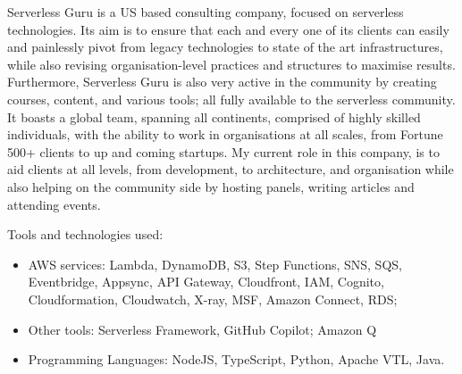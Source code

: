 \documentclass[a4paper,20pt]{article}
\begin{document}
Serverless Guru is a US based consulting company, focused on serverless 
technologies. Its aim is to ensure that each and every one of its clients 
can easily and painlessly pivot from legacy technologies to state of the art 
infrastructures, while also revising organisation-level practices and structures 
to maximise results. Furthermore, Serverless Guru is also very active in the 
community by creating courses, content, and various tools; all fully available 
to the serverless community. It boasts a global team, spanning all continents, 
comprised of highly skilled individuals, with the ability to work in 
organisations at all scales, from Fortune 500+ clients to up and coming 
startups. My current role in this company, is to aid clients at all levels, from 
development, to architecture, and organisation while also helping on the 
community side by hosting panels, writing articles and attending events.\par
Tools and technologies used:
\begin{itemize} \vspace{-5pt}
    \item AWS services: Lambda, DynamoDB, S3, Step Functions, SNS, SQS, 
      Eventbridge, Appsync, API Gateway, Cloudfront, IAM, Cognito, 
      Cloudformation, Cloudwatch, X-ray, MSF, Amazon Connect, RDS;
    \vspace{-5pt}
    \item Other tools: Serverless Framework, GitHub Copilot; Amazon Q 
    \vspace{-5pt}
    \item Programming Languages: NodeJS, TypeScript, Python, Apache VTL, Java. 
    \vspace{-5pt}
    
\end{itemize} \vspace{-5pt}
\vspace{5pt}
\end{document}
